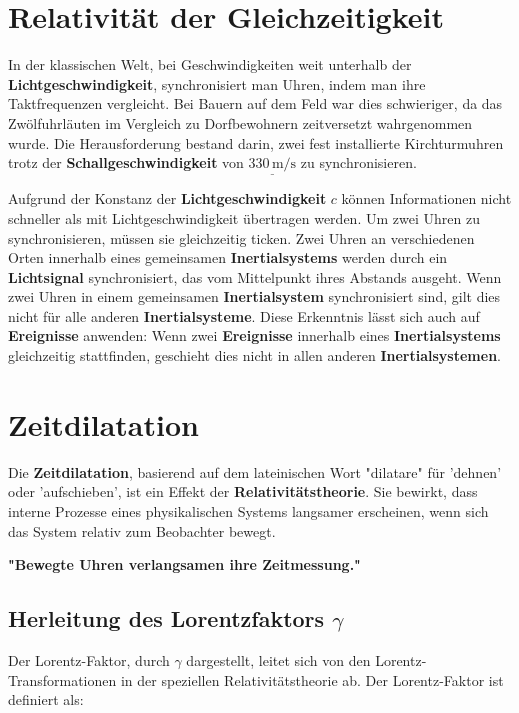 \documentclass[a4paper]{report}
\begin{document}
\chapter{Relativität der Gleichzeitigkeit}
In der klassischen Welt, bei Geschwindigkeiten weit unterhalb der \textbf{Lichtgeschwindigkeit}, synchronisiert man Uhren, indem man ihre Taktfrequenzen vergleicht. Bei Bauern auf dem Feld war dies schwieriger, da das Zwölfuhrläuten im Vergleich zu Dorfbewohnern zeitversetzt wahrgenommen wurde.
Die Herausforderung bestand darin, zwei fest installierte Kirchturmuhren trotz der \textbf{Schallgeschwindigkeit} von \( \underline{330 \, \text{m/s}} \) zu synchronisieren.
\begin{tcolorbox}
	Aufgrund der Konstanz der \textbf{Lichtgeschwindigkeit} \(c\) können Informationen nicht schneller als mit Lichtgeschwindigkeit übertragen werden. Um zwei Uhren zu synchronisieren, müssen sie gleichzeitig ticken.
	\newline
	\newline
	Zwei Uhren an verschiedenen Orten innerhalb eines gemeinsamen \textbf{Inertialsystems} werden durch ein \textbf{Lichtsignal} synchronisiert, das vom Mittelpunkt ihres Abstands ausgeht.
	\newline
	Wenn zwei Uhren in einem gemeinsamen \textbf{Inertialsystem} synchronisiert sind, gilt dies nicht für alle anderen \textbf{Inertialsysteme}.
	\newline
	Diese Erkenntnis lässt sich auch auf \textbf{Ereignisse} anwenden: Wenn zwei \textbf{Ereignisse} innerhalb eines \textbf{Inertialsystems} gleichzeitig stattfinden, geschieht dies nicht in allen anderen \textbf{Inertialsystemen}.\end{tcolorbox}
\chapter{Zeitdilatation}
\begin{tcolorbox}
	Die \textbf{Zeitdilatation}, basierend auf dem lateinischen Wort "dilatare" für 'dehnen' oder 'aufschieben', ist ein Effekt der \textbf{Relativitätstheorie}. Sie bewirkt, dass interne Prozesse eines physikalischen Systems langsamer erscheinen, wenn sich das System relativ zum Beobachter bewegt.
\end{tcolorbox}
\textbf{"Bewegte Uhren verlangsamen ihre Zeitmessung."}
\section{Herleitung des Lorentzfaktors $\gamma$}
Der Lorentz-Faktor, durch \( \gamma \) dargestellt, leitet sich von den Lorentz-Transformationen in der speziellen Relativitätstheorie ab. Der Lorentz-Faktor ist definiert als:
\end{document}
